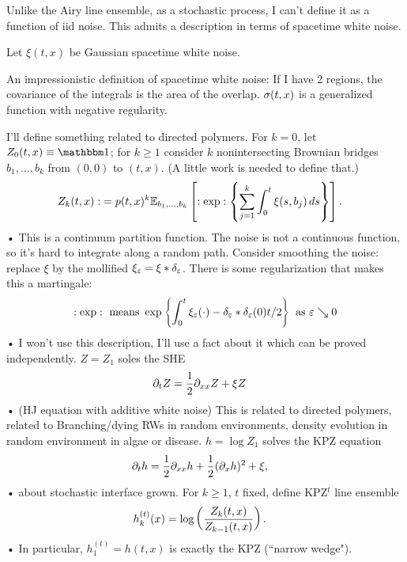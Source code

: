 Unlike the Airy line ensemble,
as a stochastic process, I can't define it as a function of iid noise. 
This admits a description in terms of spacetime white noise.

Let $\xi(t,x)$ be Gaussian spacetime white noise.

An impressionistic definition of spacetime white noise: If I have 2 regions, the covariance of the integrals is the area of the overlap. $\sigma(t,x)$ is a generalized function with negative regularity. 

I'll define something related to directed polymers. For $k=0$, let $Z_0(t,x)\equiv \one$; for $k\ge 1$ consider $k$ nonintersecting Brownian bridges $b_1,\ldots, b_k$ from $(0,0)$ to $(t,x)$. (A little work is needed to define that.)
\begin{align*}
Z_k(t,x) :&= p(t,x)^k
\mathbb{E}_{b_1,\ldots, b_k} \left[ {:\exp: \left\{ {\sum_{j=1}^{k} \int_0^t \xi(s,b_j)\,ds} \right\}} \right].
\end{align*}•
This is a continuum partition function. The noise is not a continuous function, so it's hard to integrate along a random path. Consider smoothing the noise: replace $\xi$ by the mollified $\xi_\varepsilon = \xi*\delta_\varepsilon$. %
There is some regularization that makes this a martingale:
\begin{align*}
:\exp:\text{ means }
\exp\left\{ {\int_0^t\xi_\varepsilon(\cdot) - \delta_\varepsilon*\delta_\varepsilon(0)t/2} \right\} \text{ as }\varepsilon\searrow 0
\end{align*}•
I won't use this description, I'll use a fact about it which can be proved independently.
$Z=Z_1$ soles the SHE
\begin{align*}
\partial_t Z &= \frac{1}{2} \partial_{xx} Z+\xi Z
\end{align*}•
(HJ equation with additive white noise)
This is related to directed polymers, related to Branching/dying RWs in random environments, density evolution in random environment in algae or disease.
$h=\log Z_1$ solves the KPZ equation
\begin{align*}
\partial_t h &= \frac{1}{2}\partial_{xx}h + \frac{1}{2} (\partial_xh)^2 + \xi,
\end{align*}•
about stochastic interface grown.
For $k\ge 1$, $t$ fixed, define KPZ$^t$ line ensemble
\begin{align*}
h_k^{(t)} (x) &= \log\left( {\frac{Z_k(t,x)}{Z_{k-1}(t,x)}} \right).
\end{align*}•
In particular, $h_1^{(t)}=h(t,x)$ is exactly the KPZ (``narrow wedge"). 

